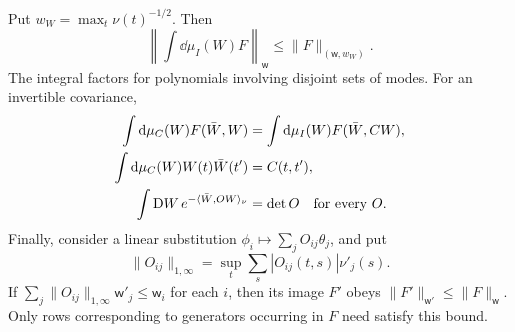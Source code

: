 \begin{proposition}\label{prop:weighted-Berezin-bounds}
Put $w_W=\max_t\nu(t)^{-1/2}$. Then
\begin{equation}\label{eq:weighted-integration-bound}
 \left\|\int\dd\mu_I(W)F\right\|_{\mathsf w}
                  \le\|F\|_{(\mathsf w,w_W)}.
\end{equation}
The integral factors for polynomials involving disjoint sets of modes.
For an invertible covariance,
\begin{align}
 \int\mathrm d\mu_C(W)F(\bar W,W)
     &=\int\mathrm d\mu_I(W)F(\bar W,CW),\label{eq:covariance-substitution}\\
 \int\mathrm d\mu_C(W)W(t)\bar W(t')&=C(t,t'),\notag\\
 \int\mathrm DW\,e^{-\langle\bar W,OW\rangle_\nu}
     &=\det O\quad\text{for every }O.\label{eq:weighted-determinant}
\end{align}
Finally, consider a linear substitution
$\phi_i\mapsto\sum_jO_{ij}\theta_j$, and put
\[
 \|O_{ij}\|_{1,\infty}
     =\sup_t\sum_s|O_{ij}(t,s)|\nu'_j(s).
\]
If $\sum_j\|O_{ij}\|_{1,\infty}\mathsf w'_j\le\mathsf w_i$ for
each $i$, then its image $F'$ obeys
$\|F'\|_{\mathsf w'}\le\|F\|_{\mathsf w}$.
Only rows corresponding to generators occurring in $F$ need satisfy
this bound.
\end{proposition}

